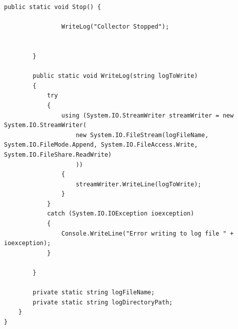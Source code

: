 \begin{Answer}
\begin{lstlisting}[caption=Data Recorder Class,
  label=code:DataRecorder,
  float=h]
        public static void Stop() {

                WriteLog("Collector Stopped");
            
        
        }

        public static void WriteLog(string logToWrite)
        {
            try
            {
                using (System.IO.StreamWriter streamWriter = new System.IO.StreamWriter(
                    new System.IO.FileStream(logFileName, System.IO.FileMode.Append, System.IO.FileAccess.Write, System.IO.FileShare.ReadWrite)
                    ))
                {
                    streamWriter.WriteLine(logToWrite);
                }
            }
            catch (System.IO.IOException ioexception)
            {
                Console.WriteLine("Error writing to log file " + ioexception);
            }
        
        }

        private static string logFileName;
        private static string logDirectoryPath;
    }
}

\end{lstlisting}
\end{Answer}


